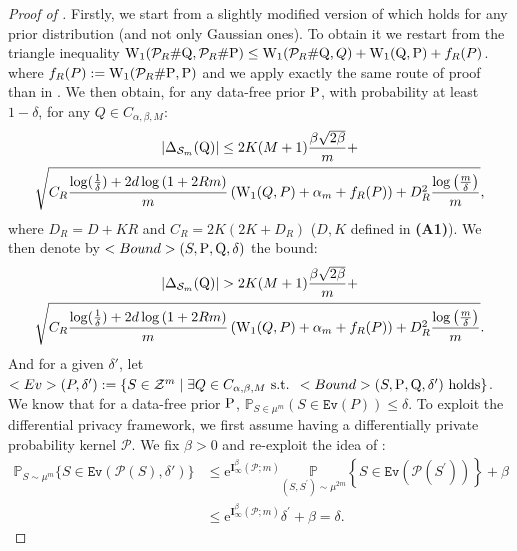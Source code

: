 \begin{proof}[Proof of ]
Firstly, we start from a slightly modified version of  which holds for any prior distribution (and not only Gaussian ones).
To obtain it we restart from the triangle inequality $\W_{1}(\mathcal{P}_{R}\# \Q, \mathcal{P}_{R}\# \P ) \leq \W_{1}(\mathcal{P}_{R}\# \Q,Q) + \W_{1}(\Q,\P) + f_R(P)$. where $f_R(P) := \W_{1}(\mathcal{P}_{R}\#\P,\P)$ and we apply exactly the same route of proof than in . We then obtain, for any data-free prior $\P$, with probability at least $1-\delta$, for any $Q\in C_{\alpha,\beta,M}$:
\begin{multline*}
|\Delta_{\Sm}(\Q)| \leq 2K(M+1)\frac{\beta\sqrt{2\beta}}{m} + \\
\sqrt{ C_R \frac{\log(\frac{1}{\delta}) + 2d\log\left(1 +2Rm \right)}{m} \left(\W_{1}( Q, P)+\alpha_m  + f_R(P)\right) + D_R^2\frac{\log\left( \frac{m}{\delta} \right)}{m} },
\end{multline*}
where $D_R= D+KR$ and $C_R= 2K(2K+D_R)$ ($D,K$ defined in \textbf{(A1)}).
We then denote by $\texttt{Bound}(S,\P,\Q,\delta)$ the bound:
\begin{multline*}
|\Delta_{\Sm}(\Q)| > 2K(M+1)\frac{\beta\sqrt{2\beta}}{m} + \\
\sqrt{ C_R \frac{\log(\frac{1}{\delta}) + 2d\log\left(1 +2Rm \right)}{m} \left(\W_{1}( Q, P)+\alpha_m  + f_R(P)\right) + D_R^2\frac{\log\left( \frac{m}{\delta} \right)}{m} }.
\end{multline*}
And for a given $\delta'$, let $\texttt{Ev}(P,\delta'):= \{S \in \mathcal{Z}^m \mid  \exists Q \in C_{\alpha,\beta,M} \text{ s.t. } \texttt{Bound}(S,\P,\Q,\delta') \text{ holds} \}$.
We know that for a data-free prior $\P$, $\mathbb{P}_{S\in\mu^m}(S\in \texttt{Ev}(P)) \leq \delta$.
To exploit the differential privacy framework, we first assume having a differentially private probability kernel $\mathcal{P}$. We fix $\beta>0$ and re-exploit the idea of \citet{dziugaite2018data}:
\begin{align}
\label{eq: pac_b_diff_priv}
\mathbb{P}_{S \sim \mu^m}\{S \in \texttt{Ev}(\mathcal{P}(S),\delta')\} & \leq \mathrm{e}^{\mathbf{I}_{\infty}^\beta(\mathcal{P} ; m)} \underset{\left(S, S^{\prime}\right) \sim \mu^{2m} }{\mathbb{P}}\left\{S \in \texttt{Ev}\left(\mathcal{P}\left(S^{\prime}\right)\right)\right\}+\beta \\
& \leq \mathrm{e}^{\mathbf{I}_{\infty}^\beta(\mathcal{P} ; m)} \delta^{\prime}+\beta = \delta .
\end{align}

\end{proof}
